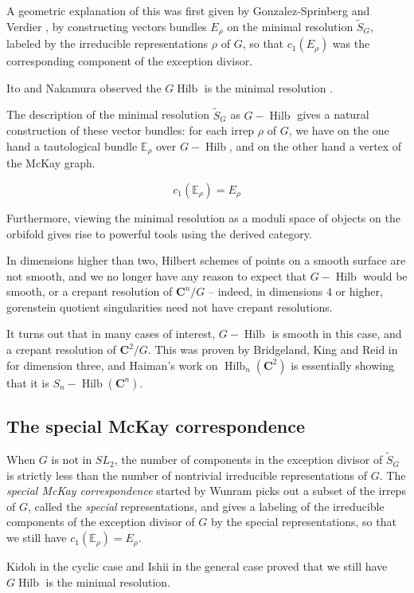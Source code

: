 \documentclass{amsart}[12pt]
\theoremstyle{definition}
\newcommand{\C}{\mathbf{C}}
\DeclareMathOperator{\Hilb}{Hilb}
\begin{document}
A geometric explanation of this was first given by Gonzalez-Sprinberg and Verdier \cite{GSV}, by constructing vectors bundles $E_\rho$ on the minimal resolution $\widetilde{S}_G$, labeled by the irreducible representations $\rho$ of $G$, so that $c_1(E_\rho)$ was the corresponding component of the exception divisor.

Ito and Nakamura observed the $G\Hilb$ is the minimal resolution \cite{IN}.

The description of the minimal resolution $\widetilde{S}_G$ as $G-\Hilb$ gives a natural construction of these vector bundles: for each irrep $\rho$ of $G$, we have on the one hand a tautological bundle $\mathbb{E}_\rho$ over $G-\Hilb$, and on the other hand a vertex of the McKay graph.  

$$c_1(\mathbb{E}_\rho)=E_\rho$$

Furthermore, viewing the minimal resolution as a moduli space of objects on the orbifold gives rise to powerful tools using the derived category.  

In dimensions higher than two, Hilbert schemes of points on a smooth surface are not smooth, and we no longer have any reason to expect that $G-\Hilb$ would be smooth, or a crepant resolution of $\C^n/G$ -- indeed, in dimensions 4 or higher, gorenstein quotient singularities need not have crepant resolutions.

It turns out that in many cases of interest, $G-\Hilb$ is smooth in this case, and a crepant resolution of $\C^2/G$.  This was proven by Bridgeland, King and Reid in \cite{BKR} for dimension three, and Haiman's work on $\Hilb_n(\C^2)$ is essentially showing that it is $S_n-\Hilb(\C^n)$.



\subsection{The special McKay correspondence}

When $G$ is not in $SL_2$, the number of components in the exception divisor of $\widetilde{S}_G$ is strictly less than the number of nontrivial irreducible representations of $G$.  The \emph{special McKay correspondence} started by Wunram \cite{wunram} picks out a subset of the irreps of $G$, called the \emph{special} representations, and gives a labeling of the irreducible components of the exception divisor of $G$ by the special representations, so that we still have $c_1(\mathbb{E}_\rho)=E_\rho$.

Kidoh \cite{Kidoh} in the cyclic case and Ishii \cite{ishii} in the general case proved that we still have $G\Hilb$ is the minimal resolution.
\end{document}
